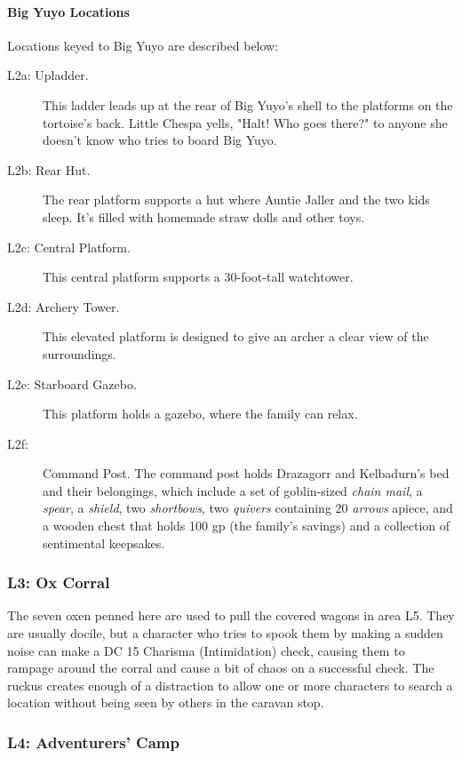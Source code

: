 \documentclass[letterpaper, 11pt, bg=full, twocolumn]{dndbook}
\begin{document}
\paragraph{Big Yuyo Locations}

Locations keyed to Big Yuyo are described below:

\begin{description}
\item[L2a: Upladder.] This ladder leads up at the rear of Big Yuyo's shell to the platforms on the tortoise's back. Little Chespa yells, "Halt! Who goes there?" to anyone she doesn't know who tries to board Big Yuyo.
\item[L2b: Rear Hut.] The rear platform supports a hut where Auntie Jaller and the two kids sleep. It's filled with homemade straw dolls and other toys.
\item[L2c: Central Platform.] This central platform supports a 30-foot-tall watchtower.
\item[L2d: Archery Tower.] This elevated platform is designed to give an archer a clear view of the surroundings.
\item[L2e: Starboard Gazebo.] This platform holds a gazebo, where the family can relax.
\item[L2f:] Command Post. The command post holds Drazagorr and Kelbadurn's bed and their belongings, which include a set of goblin-sized \textit{chain mail}, a \textit{spear}, a \textit{shield}, two \textit{shortbows}, two \textit{quivers} containing 20 \textit{arrows} apiece, and a wooden chest that holds 100 gp (the family's savings) and a collection of sentimental keepsakes.
\end{description}

\subsubsection{L3: Ox Corral}

The seven oxen penned here are used to pull the covered wagons in area L5. They are usually docile, but a character who tries to spook them by making a sudden noise can make a DC 15 Charisma (Intimidation) check, causing them to rampage around the corral and cause a bit of chaos on a successful check. The ruckus creates enough of a distraction to allow one or more characters to search a location without being seen by others in the caravan stop.

\subsubsection{L4: Adventurers' Camp}
\end{document}
